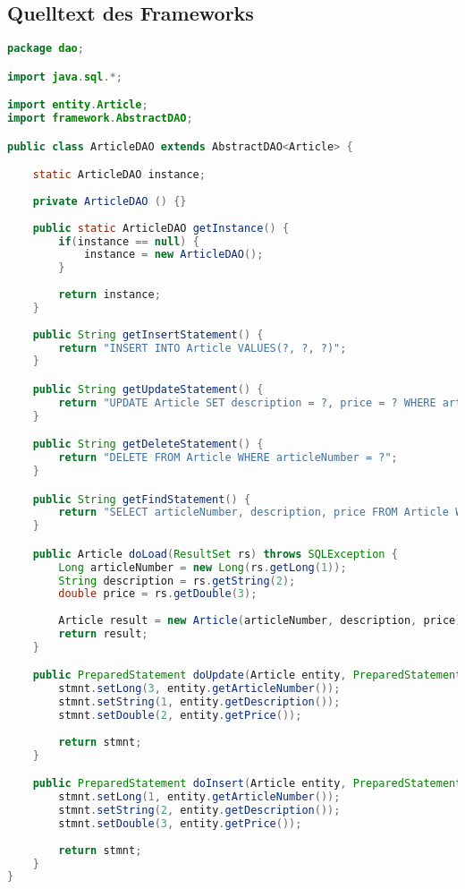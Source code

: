 \subsection{Quelltext des Frameworks}
\begin{lstlisting}[language=java, style=java, caption={ArticleDAO.java},
label={lst:lst1}]
package dao;

import java.sql.*;

import entity.Article;
import framework.AbstractDAO;

public class ArticleDAO extends AbstractDAO<Article> {

	static ArticleDAO instance;
	
	private ArticleDAO () {}
	
	public static ArticleDAO getInstance() {
		if(instance == null) {
			instance = new ArticleDAO();
		}
		
		return instance;
	}
	
	public String getInsertStatement() {
		return "INSERT INTO Article VALUES(?, ?, ?)";
	}

	public String getUpdateStatement() {
		return "UPDATE Article SET description = ?, price = ? WHERE articleNumber = ?";
	}

	public String getDeleteStatement() {
		return "DELETE FROM Article WHERE articleNumber = ?";
	}

	public String getFindStatement() {
		return "SELECT articleNumber, description, price FROM Article WHERE articleNumber=?";
	}

	public Article doLoad(ResultSet rs) throws SQLException {
		Long articleNumber = new Long(rs.getLong(1));
		String description = rs.getString(2);
		double price = rs.getDouble(3);
		
		Article result = new Article(articleNumber, description, price);
		return result;
	}

	public PreparedStatement doUpdate(Article entity, PreparedStatement stmnt) throws SQLException {
        stmnt.setLong(3, entity.getArticleNumber());
        stmnt.setString(1, entity.getDescription());
        stmnt.setDouble(2, entity.getPrice());
        
		return stmnt;
	}

	public PreparedStatement doInsert(Article entity, PreparedStatement stmnt) throws SQLException {
        stmnt.setLong(1, entity.getArticleNumber());
        stmnt.setString(2, entity.getDescription());
        stmnt.setDouble(3, entity.getPrice());
        
		return stmnt;
	}
}
\end{lstlisting}



